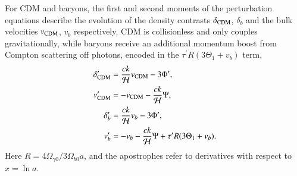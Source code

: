 \documentclass[twocolumn]{aa}
\begin{document}
For CDM and baryons, the first and second moments of the perturbation equations describe the evolution of the density contrasts $\delta_{\rm CDM}$, $\delta_b$ and the bulk velocities $v_{\rm CDM}$, $v_b$ respectively. CDM is collisionless and only couples gravitationally, while baryons receive an additional momentum boost from Compton scattering off photons, encoded in the $\tau^\prime R(3\Theta_1 + v_b)$ term,
\begin{align*}
\delta_{\rm CDM}^\prime &= \frac{ck}{\mathcal{H}} v_{\rm CDM} - 3\Phi^\prime, \\
v_{\rm CDM}^\prime &= -v_{\rm CDM} -\frac{ck}{\mathcal{H}} \Psi, \\
\delta_b^\prime &= \frac{ck}{\mathcal{H}}v_b -3\Phi^\prime, \\
v_b^\prime &= -v_b - \frac{ck}{\mathcal{H}}\Psi + \tau^\prime R(3\Theta_1 + v_b).
\end{align*}
Here $R = 4\Omega_{\gamma 0}/3\Omega_{b 0} a$, and the apostrophes refer to derivatives with respect to $x=\ln a$.
\end{document}
